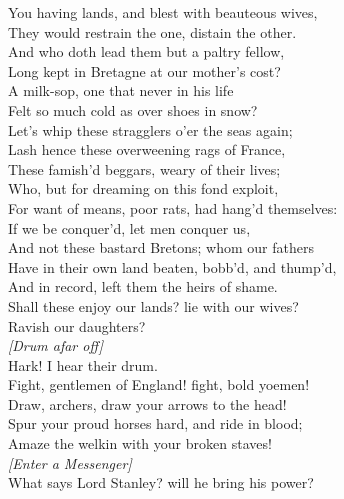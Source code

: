 \documentclass{article}
\begin{document}
\begin{description}
\hspace{1pt}You having lands, and blest with beauteous wives,\\
\hspace{1pt}They would restrain the one, distain the other.\\
\hspace{1pt}And who doth lead them but a paltry fellow,\\
\hspace{1pt}Long kept in Bretagne at our mother's cost?\\
\hspace{1pt}A milk-sop, one that never in his life\\
\hspace{1pt}Felt so much cold as over shoes in snow?\\
\hspace{1pt}Let's whip these stragglers o'er the seas again;\\
\hspace{1pt}Lash hence these overweening rags of France,\\
\hspace{1pt}These famish'd beggars, weary of their lives;\\
\hspace{1pt}Who, but for dreaming on this fond exploit,\\
\hspace{1pt}For want of means, poor rats, had hang'd themselves:\\
\hspace{1pt}If we be conquer'd, let men conquer us,\\
\hspace{1pt}And not these bastard Bretons; whom our fathers\\
\hspace{1pt}Have in their own land beaten, bobb'd, and thump'd,\\
\hspace{1pt}And in record, left them the heirs of shame.\\
\hspace{1pt}Shall these enjoy our lands?  lie with our wives?\\
\hspace{1pt}Ravish our daughters?\\
{\it [Drum afar off]}\\
\hspace{1pt}Hark! I hear their drum.\\
\hspace{1pt}Fight, gentlemen of England! fight, bold yoemen!\\
\hspace{1pt}Draw, archers, draw your arrows to the head!\\
\hspace{1pt}Spur your proud horses hard, and ride in blood;\\
\hspace{1pt}Amaze the welkin with your broken staves!\\
{\it [Enter a Messenger]}\\
\hspace{1pt}What says Lord Stanley? will he bring his power?\\
\end{description}
\end{document}
